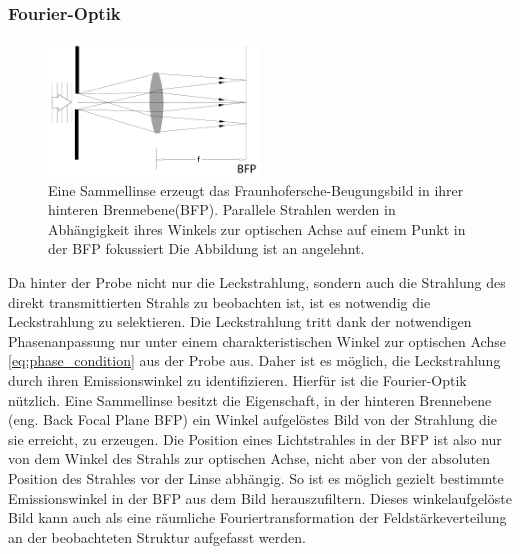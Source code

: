 \documentclass[titlepage]{article}
\begin{document}
	\subsubsection{Fourier-Optik}
		\begin{figure}[htbp] 
		\centering
		\includegraphics[width=0.5\textwidth]{figures/FourierLinse.pdf}
		\caption{Eine Sammellinse erzeugt das Fraunhofersche-Beugungsbild in ihrer hinteren Brennebene(BFP). Parallele Strahlen werden in Abhängigkeit ihres Winkels zur optischen Achse auf einem Punkt in der BFP fokussiert Die Abbildung ist an \cite{Hecht.2018} angelehnt.}
		\label{fig:FourierLinse}
	\end{figure}
	Da hinter der Probe nicht nur die Leckstrahlung, sondern auch die Strahlung des direkt transmittierten Strahls zu beobachten ist, ist es notwendig die Leckstrahlung zu selektieren. Die Leckstrahlung tritt dank der notwendigen Phasenanpassung nur unter einem charakteristischen Winkel zur optischen Achse \eqref{eq:phase_condition} aus der Probe aus. Daher ist es möglich, die Leckstrahlung durch ihren Emissionswinkel zu identifizieren. Hierfür ist die Fourier-Optik nützlich. Eine Sammellinse besitzt die Eigenschaft, in  der hinteren Brennebene (eng. Back Focal Plane BFP) ein Winkel aufgelöstes Bild von der Strahlung die sie erreicht, zu erzeugen.\cite{Hecht.1996} Die Position eines Lichtstrahles in der BFP ist also nur von dem Winkel des Strahls zur optischen Achse, nicht aber von der absoluten Position des Strahles vor der Linse abhängig. So ist es möglich gezielt bestimmte Emissionswinkel in der BFP aus dem Bild herauszufiltern. Dieses winkelaufgelöste Bild kann auch als eine räumliche Fouriertransformation der Feldstärkeverteilung an der beobachteten Struktur aufgefasst werden. 
	
\end{document}
